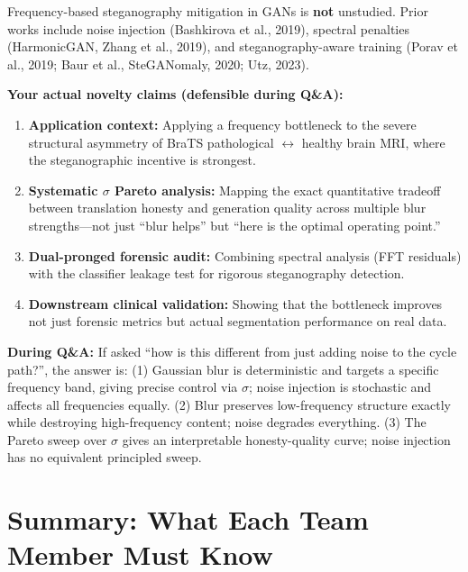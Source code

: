 \documentclass[11pt,a4paper]{article}
\theoremstyle{definition}
\begin{document}
Frequency-based steganography mitigation in GANs is \textbf{not} unstudied. Prior works include noise injection (Bashkirova et al., 2019), spectral penalties (HarmonicGAN, Zhang et al., 2019), and steganography-aware training (Porav et al., 2019; Baur et al., SteGANomaly, 2020; Utz, 2023).

\textbf{Your actual novelty claims (defensible during Q\&A):}
\begin{enumerate}
    \item \textbf{Application context:} Applying a frequency bottleneck to the severe structural asymmetry of BraTS pathological $\leftrightarrow$ healthy brain MRI, where the steganographic incentive is strongest.
    \item \textbf{Systematic $\sigma$ Pareto analysis:} Mapping the exact quantitative tradeoff between translation honesty and generation quality across multiple blur strengths---not just ``blur helps'' but ``here is the optimal operating point.''
    \item \textbf{Dual-pronged forensic audit:} Combining spectral analysis (FFT residuals) with the classifier leakage test for rigorous steganography detection.
    \item \textbf{Downstream clinical validation:} Showing that the bottleneck improves not just forensic metrics but actual segmentation performance on real data.
\end{enumerate}

\begin{edgecase}
\textbf{During Q\&A:} If asked ``how is this different from just adding noise to the cycle path?'', the answer is: (1) Gaussian blur is deterministic and targets a specific frequency band, giving precise control via $\sigma$; noise injection is stochastic and affects all frequencies equally. (2) Blur preserves low-frequency structure exactly while destroying high-frequency content; noise degrades everything. (3) The Pareto sweep over $\sigma$ gives an interpretable honesty-quality curve; noise injection has no equivalent principled sweep.
\end{edgecase}

\section{Summary: What Each Team Member Must Know}
\end{document}
